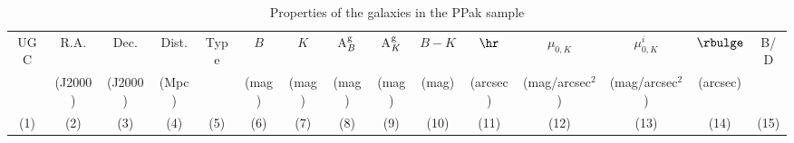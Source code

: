 %
\begin{table}
\centering
\caption{\label{tab:UGC}
Properties of the galaxies in the PPak sample}
%
{\tiny 
\renewcommand{\tabcolsep}{0.6mm}
\begin{tabular}{|rrrrlcrcccrccrc|}
\hline
%
\multicolumn{1}{|c}{UGC}             & 
\multicolumn{1}{c}{R.A.}             & 
\multicolumn{1}{c}{Dec.}             & 
\multicolumn{1}{c}{Dist.}            &   
\multicolumn{1}{c}{Type}             & 
\multicolumn{1}{c}{$B$}              &   
\multicolumn{1}{c}{$K$}              & 
\multicolumn{1}{c}{A$_B^{\rm g}$}    & 
\multicolumn{1}{c}{A$_K^{\rm g}$}    & 
\multicolumn{1}{c}{$B-K$}            &
\multicolumn{1}{c}{$\hr$}            & 
\multicolumn{1}{c}{$\mu_{0,K}$}      & 
\multicolumn{1}{c}{$\mu_{0,K}^{i}$}  & 
\multicolumn{1}{c}{$\rbulge$}        & 
\multicolumn{1}{c|}{B/D}             \\ 
%
\multicolumn{1}{|c}{}                &   
\multicolumn{1}{c}{(J2000)}          & 
\multicolumn{1}{c}{(J2000)}          & 
\multicolumn{1}{c}{(Mpc)}            & 
\multicolumn{1}{c}{}                 &   
\multicolumn{1}{c}{(mag)}            & 
\multicolumn{1}{c}{(mag)}            &   
\multicolumn{1}{c}{(mag)}            &   
\multicolumn{1}{c}{(mag)}            & 
\multicolumn{1}{c}{(mag)}            &
\multicolumn{1}{c}{(arcsec)}         &
\multicolumn{1}{c}{(mag/arcsec$^2$)} &
\multicolumn{1}{c}{(mag/arcsec$^2$)} &
\multicolumn{1}{c}{(arcsec)}         &
\multicolumn{1}{c|}{}                \\
%
\multicolumn{1}{|c}{(1)}             &   
\multicolumn{1}{c}{(2)}              & 
\multicolumn{1}{c}{(3)}              & 
\multicolumn{1}{c}{(4)}              & 
\multicolumn{1}{c}{(5)}              &   
\multicolumn{1}{c}{(6)}              & 
\multicolumn{1}{c}{(7)}              &   
\multicolumn{1}{c}{(8)}              &   
\multicolumn{1}{c}{(9)}              & 
\multicolumn{1}{c}{(10)}             &
\multicolumn{1}{c}{(11)}             &
\multicolumn{1}{c}{(12)}             &
\multicolumn{1}{c}{(13)}             &
\multicolumn{1}{c}{(14)}             &
\multicolumn{1}{c|}{(15)}            \\
%

\end{tabular}}
\end{table}
